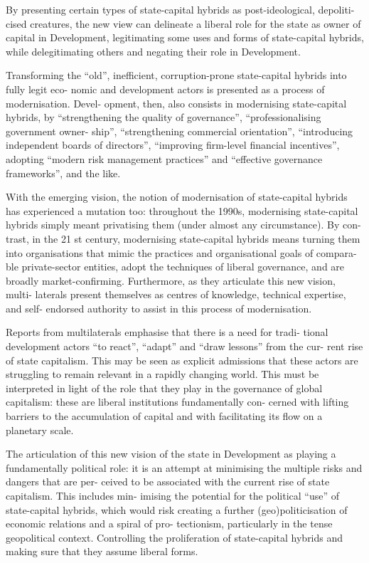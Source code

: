 \documentclass[
]{book}
\begin{document}
By presenting certain types of state-capital hybrids as post-ideological, depoliti-
cised creatures, the new view can delineate a liberal role for the state as owner of
capital in Development, legitimating some uses and forms of state-capital hybrids,
while delegitimating others and negating their role in Development.

Transforming
the ``old'', inefficient, corruption-prone state-capital hybrids into fully legit eco-
nomic and development actors is presented as a process of modernisation. Devel-
opment, then, also consists in modernising state-capital hybrids, by
``strengthening the quality of governance'', ``professionalising government owner-
ship'', ``strengthening commercial orientation'', ``introducing independent boards
of directors'', ``improving firm-level financial incentives'', adopting ``modern risk
management practices'' and ``effective governance frameworks'', and the like.

With the emerging vision, the notion of modernisation of state-capital hybrids has
experienced a mutation too: throughout the 1990s, modernising state-capital
hybrids simply meant privatising them (under almost any circumstance). By con-
trast, in the 21 st century, modernising state-capital hybrids means turning them
into organisations that mimic the practices and organisational goals of compara-
ble private-sector entities, adopt the techniques of liberal governance, and are
broadly market-confirming. Furthermore, as they articulate this new vision, multi-
laterals present themselves as centres of knowledge, technical expertise, and self-
endorsed authority to assist in this process of modernisation.

Reports from multilaterals emphasise that there is a need for tradi-
tional development actors ``to react'', ``adapt'' and ``draw lessons'' from the cur-
rent rise of state capitalism. This may be seen as explicit admissions that these
actors are struggling to remain relevant in a rapidly changing world.
This must be interpreted in light of the role that they play in the
governance of global capitalism: these are liberal institutions fundamentally con-
cerned with lifting barriers to the accumulation of capital and with facilitating its
flow on a planetary scale.

The articulation
of this new vision of the state in Development as playing a fundamentally political
role: it is an attempt at minimising the multiple risks and dangers that are per-
ceived to be associated with the current rise of state capitalism. This includes min-
imising the potential for the political ``use'' of state-capital hybrids, which would
risk creating a further (geo)politicisation of economic relations and a spiral of pro-
tectionism, particularly in the tense geopolitical context.
Controlling the proliferation of state-capital hybrids and making sure that they
assume liberal forms.
\end{document}
